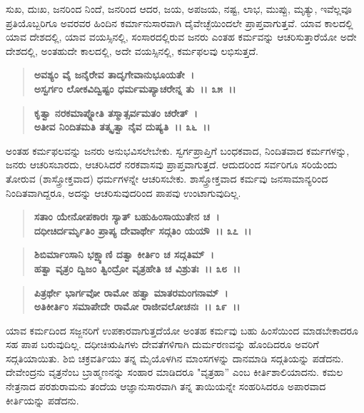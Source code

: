 ಸುಖ, ದುಃಖ, ಜನರಿಂದ ನಿಂದೆ, ಜನರಿಂದ ಆದರ, ಜಯ, ಅಪಜಯ, ನಷ್ಟ, ಲಾಭ, ಮುಪ್ಪು, ಮೃತ್ಯು, ಇವೆಲ್ಲವೂ ಪ್ರತಿಯೊಬ್ಬರಿಗೂ ಅವರವರ ಹಿಂದಿನ ಕರ್ಮಾನುಸಾರವಾಗಿ ದೈವೇಚ್ಛೆಯಿಂದಲೇ ಪ್ರಾಪ್ತವಾಗುತ್ತವೆ. ಯಾವ ಕಾಲದಲ್ಲಿ ಯಾವ ದೇಶದಲ್ಲಿ, ಯಾವ ವಯಸ್ಸಿನಲ್ಲಿ, ಸಂಸಾರದಲ್ಲಿರುವ ಜನರು ಎಂತಹ ಕರ್ಮವನ್ನು ಆಚರಿಸುತ್ತಾರೆಯೋ ಅದೇ ದೇಶದಲ್ಲಿ, ಅಂತಹುದೇ ಕಾಲದಲ್ಲಿ, ಅದೇ ವಯಸ್ಸಿನಲ್ಲಿ, ಕರ್ಮಫಲವು ಲಭಿಸುತ್ತದೆ.

\begin{verse}
\textbf{ಅವಶ್ಯಂ ವೈ ಜನೈರೇವ ತಾದೃಗೇವಾನುಭೂಯತೇ~।}\\\textbf{ಅಸ್ವರ್ಗಂ ಲೋಕವಿದ್ವಿಷ್ಟಂ ಧರ್ಮಮಪ್ಯಾಚರೇನ್ನ ತು~।। ೩೫~।। }
\end{verse}

\begin{verse}
\textbf{ಕೃತ್ವಾ ನರಕಮಾಪ್ನೋತಿ ತಸ್ಮಾತ್ಸರ್ವಮತಂ ಚರೇತ್~।}\\\textbf{ಅತೀವ ನಿಂದಿತಮತಿ ತತ್ಕೃತ್ವಾ ನೈವ ದುಷ್ಯತಿ~।। ೩೬~।।}
\end{verse}

ಅಂತಹ ಕರ್ಮಫಲವನ್ನು ಜನರು ಅನುಭವಿಸಲೇಬೇಕು. ಸ್ವರ್ಗಪ್ರಾಪ್ತಿಗೆ ಬಂಧಕವಾದ, ನಿಂದಿತವಾದ ಕರ್ಮಗಳನ್ನು, ಜನರು ಆಚರಿಸಬಾರದು, ಆಚರಿಸಿದರೆ ನರಕವಾಸವು ಪ್ರಾಪ್ತವಾಗುತ್ತದೆ. ಆದುದರಿಂದ ಸರ್ವರಿಗೂ ಸರಿಯೆಂದು ತೋರುವ (ಶಾಸ್ತ್ರೋಕ್ತವಾದ) ಧರ್ಮಗಳನ್ನೇ ಆಚರಿಸಬೇಕು. ಶಾಸ್ತ್ರೋಕ್ತವಾದ ಕರ್ಮವು ಜನಸಾಮಾನ್ಯರಿಂದ ನಿಂದಿತವಾಗಿದ್ದರೂ, ಅದನ್ನು ಆಚರಿಸುವುದರಿಂದ ಪಾಪವು ಉಂಟಾಗುವುದಿಲ್ಲ.

\begin{verse}
\textbf{ಸತಾಂ ಯೇನೋಪಕಾರಃ ಸ್ಯಾತ್ ಬಹುಹಿಂಸಾಯುತೇನ ಚ~।}\\\textbf{ದಧೀಚಿರ್ದರ್ಮೃತಿಂ ಪ್ರಾಪ್ಯ ದೇವಾರ್ಥೇ ಸದ್ಗತಿಂ ಯಯೌ~।। ೩೭~।। }
\end{verse}

\begin{verse}
\textbf{ಶಿಬಿರ್ಮಾಂಸಾನಿ ಭಕ್ಷ್ಯಾಣಿ ದತ್ವಾ ಕೀರ್ತಿಂ ಚ ಸದ್ಗತಿಮ್~।}\\\textbf{ಹತ್ವಾ ವೃತ್ರಂ ದ್ವಿಜಂ ತ್ವಿಂದ್ರೋ ವೃತ್ರಹೇತಿ ಚ ವಿಶ್ರುತಃ~।। ೩೮~।। }
\end{verse}

\begin{verse}
\textbf{ಪಿತ್ರರ್ಥೇ ಭಾರ್ಗವೋ ರಾಮೋ ಹತ್ವಾ ಮಾತರಮಂಗನಾಮ್~।}\\\textbf{ಅತಿಕೀರ್ತಿಂ ಸಮಾಪೇದೇ ರಾಮೋ ರಾಜೀವಲೋಚನಃ~।। ೩೯~।।}
\end{verse}

ಯಾವ ಕರ್ಮದಿಂದ ಸಜ್ಜನರಿಗೆ ಉಪಕಾರವಾಗುತ್ತದೆಯೋ ಅಂತಹ ಕರ್ಮವು ಬಹು ಹಿಂಸೆಯಿಂದ ಮಾಡಬೇಕಾದರೂ ಸಹ ಪಾಪ ಬರುವುದಿಲ್ಲ. ದಧೀಚಿಋಷಿಗಳು ದೇವತೆಗಳಿಗಾಗಿ ದುರ್ಮರಣವನ್ನು ಹೊಂದಿದರೂ ಅವರಿಗೆ ಸದ್ಗತಿಯಾಯಿತು. ಶಿಬಿ ಚಕ್ರವರ್ತಿಯು ತನ್ನ ಮೈಯೊಳಗಿನ ಮಾಂಸಗಳನ್ನು ದಾನಮಾಡಿ ಸದ್ಗತಿಯನ್ನು ಪಡೆದನು. ದೇವೇಂದ್ರನು ವೃತ್ರನೆಂಬ ಬ್ರಾಹ್ಮಣನನ್ನು ಸಂಹಾರ ಮಾಡಿದರೂ "ವೃತ್ರಹಾ” ಎಂಬ ಕೀರ್ತಿಶಾಲಿಯಾದನು. ಕಮಲ ನೇತ್ರನಾದ ಪರಶುರಾಮನು ತಂದೆಯ ಆಜ್ಞಾನುಸಾರವಾಗಿ ತನ್ನ ತಾಯಿಯನ್ನೇ ಸಂಹರಿಸಿದರೂ ಅಪಾರವಾದ ಕೀರ್ತಿಯನ್ನು ಪಡೆದನು.

